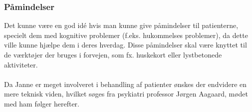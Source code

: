 \subsubsection{Påmindelser}
Det kunne være en god idé hvis man kunne give påmindelser til patienterne, specielt dem med kognitive problemer (f.eks. hukommelses problemer), da dette ville kunne hjælpe dem i deres hverdag.
Disse påmindelser skal være knyttet til de værktøjer der bruges i forvejen, som fx. huskekort eller lystbetonede aktiviteter.

\paragraph{}
Da Janne er meget involveret i behandling af patienter ønskes der endvidere en mere teknisk viden, hvilket søges fra psykiatri professor Jørgen Aagaard, mødet med ham følger herefter.